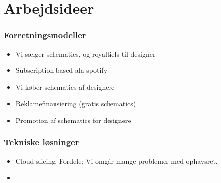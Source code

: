 \chapter{Arbejdsideer} %
\label{cha:arbejdsideer}

\subsection{Forretningsmodeller} %
\label{sub:forretningsmodeller}

\begin{itemize}
	\item Vi sælger schematics, og royaltiels til designer
	\item Subscription-based ala spotify
	\item Vi køber schematics af designere
	\item Reklamefinansiering (gratis schematics)
	\item Promotion af schematics for designere
\end{itemize}


\subsection{Tekniske løsninger} %
\label{sub:tekniske_l_sninger}

\begin{itemize}
	\item Cloud-slicing. Fordele: Vi omgår mange problemer med ophavsret.

	\item 
\end{itemize}


